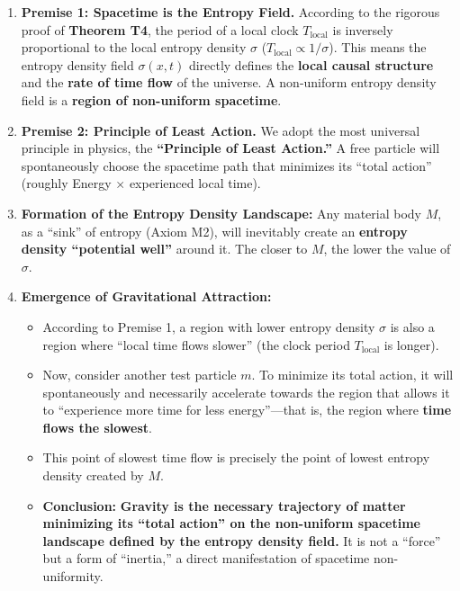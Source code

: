 \documentclass[11pt, a4paper]{article}
\begin{document}
\begin{enumerate}
    \item \textbf{Premise 1: Spacetime is the Entropy Field.} According to the rigorous proof of \textbf{Theorem T4}, the period of a local clock $T_{\text{local}}$ is inversely proportional to the local entropy density $\sigma$ ($T_{\text{local}} \propto 1/\sigma$). This means the entropy density field $\sigma(x,t)$ directly defines the \textbf{local causal structure} and the \textbf{rate of time flow} of the universe. A non-uniform entropy density field is a \textbf{region of non-uniform spacetime}.

    \item \textbf{Premise 2: Principle of Least Action.} We adopt the most universal principle in physics, the \textbf{``Principle of Least Action.''} A free particle will spontaneously choose the spacetime path that minimizes its ``total action'' (roughly Energy $\times$ experienced local time).

    \item \textbf{Formation of the Entropy Density Landscape:} Any material body $M$, as a ``sink'' of entropy (Axiom M2), will inevitably create an \textbf{entropy density ``potential well''} around it. The closer to $M$, the lower the value of $\sigma$.

    \item \textbf{Emergence of Gravitational Attraction:}
    \begin{itemize}
        \item According to Premise 1, a region with lower entropy density $\sigma$ is also a region where ``local time flows slower'' (the clock period $T_{\text{local}}$ is longer).
        \item Now, consider another test particle $m$. To minimize its total action, it will spontaneously and necessarily accelerate towards the region that allows it to ``experience more time for less energy''—that is, the region where \textbf{time flows the slowest}.
        \item This point of slowest time flow is precisely the point of lowest entropy density created by $M$.
        \item \textbf{Conclusion:} \textbf{Gravity is the necessary trajectory of matter minimizing its ``total action'' on the non-uniform spacetime landscape defined by the entropy density field.} It is not a ``force'' but a form of ``inertia,'' a direct manifestation of spacetime non-uniformity.
    \end{itemize}
\end{enumerate}
\end{document}
